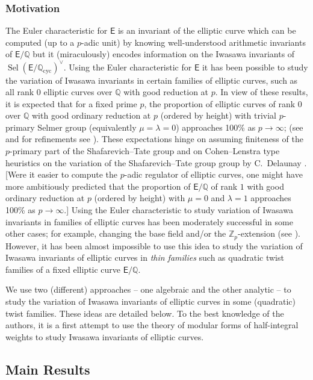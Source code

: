 \documentclass{amsart}
\numberwithin{equation}{section}
\theoremstyle{remark}
\newcommand{\cyc}{\operatorname{cyc}}
\newcommand{\Sel}{\operatorname{Sel}}
\newcommand{\Zp}{\mathbb{Z}_p}
\newcommand{\Q}{\mathbb{Q}}
\newcommand{\EC}{\mathsf{E}}
\theoremstyle{plain} %
\begin{document}
\subsubsection*{Motivation}
The Euler characteristic for $\EC$ is an invariant of the elliptic curve which can be computed (up to a $p$-adic unit) by knowing well-understood arithmetic invariants of $\EC/\Q$ but it (miraculously) encodes information on the Iwasawa invariants of $\Sel(\EC/\Q_{\cyc})^\vee$.
Using the Euler characteristic for $\EC$ it has been possible to study the variation of Iwasawa invariants in certain families of elliptic curves, such as all rank 0 elliptic curves over $\Q$ with good reduction at $p$.
In view of these results, it is expected that for a fixed prime $p$, the proportion of elliptic curves of rank 0 over $\Q$ with good ordinary reduction at $p$ (ordered by height) with trivial $p$-primary Selmer group (equivalently $\mu=\lambda=0$) approaches 100\% as $p \to \infty$; (see \cite[Conjecture~4.7]{KR21} and for refinements see \cite{KR24}).
These expectations hinge on assuming finiteness of the $p$-primary part of the Shafarevich--Tate group and on Cohen--Lenstra type heuristics on the variation of the Shafarevich--Tate group group by C.~Delaunay \cite{Del01}.
[Were it easier to compute the $p$-adic regulator of elliptic curves, one might have more ambitiously predicted that the proportion of $\EC/\Q$ of rank $1$ with good ordinary reduction at $p$ (ordered by height) with $\mu=0$ and $\lambda=1$ approaches 100\% as $p \to \infty$.]
Using the Euler characteristic to study variation of Iwasawa invariants in families of elliptic curves has been moderately successful in some other cases; for example, changing the base field and/or the $\Zp$-extension (see \cite{KLR21_noncomm, HKR}).
However, it has been almost impossible to use this idea to study the variation of Iwasawa invariants of elliptic curves in \emph{thin families} such as quadratic twist families of a fixed elliptic curve $\EC/\Q$.

We use two (different) approaches -- one algebraic and the other analytic -- to study the variation of Iwasawa invariants of elliptic curves in some (quadratic) twist families.
These ideas are detailed below.
To the best knowledge of the authors, it is a first attempt to use the theory of modular forms of half-integral weights to study Iwasawa invariants of elliptic curves.

\subsection{Main Results}
\end{document}
